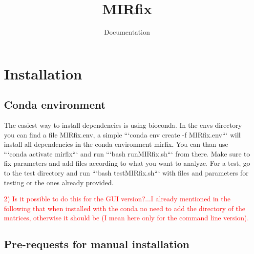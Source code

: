 \documentclass[a4paper,20pt]{report}
\title{\huge  \textbf{MIRfix}}
\author{\huge Documentation}
\date{ }
\newcommand{\note}{\textcolor{red}}
\begin{document}
\maketitle
 
\tableofcontents
\pagebreak
\chapter*{Installation}
\section{Conda environment}
\noindent
The easiest way to install dependencies is using bioconda.
In the envs directory you can find a file MIRfix.env, a simple ```conda env create -f MIRfix.env``` will install all dependencies in the conda environment mirfix.
You can than use ```conda activate mirfix``` and run ```bash runMIRfix.sh``` from there.
Make sure to fix parameters and add files according to what you want to analyze.
For a test, go to the test directory and run ```bash testMIRfix.sh``` with files and parameters for testing or the ones already provided.

\note{ 2) Is it possible to do this for the GUI version?...I already
  mentioned in the following that when installed with the conda no
  need to add the directory of the matrices, otherwise it should be (I
  mean here only for the command line version).\\}
\section{Pre-requests for manual installation}
\end{document}
